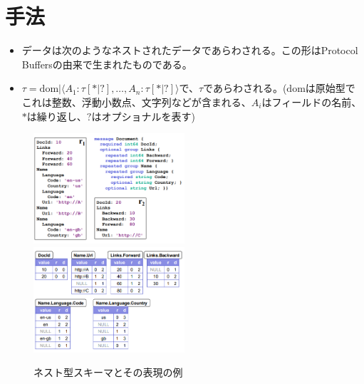 \documentclass[dvipdfmx,uplatex]{jsarticle}
\theoremstyle{remark}
\newenvironment{method}[1]{
    \begin{tcolorbox}[
        colframe=green!50!black,
        colback=green!50!black!10!white,
        colbacktitle=green!50!black!40!white,
        coltitle=black,
        fonttitle=\bfseries,
        title={#1}
    ]
}{
    \end{tcolorbox}
}
\begin{document}
\section{手法}
\begin{method}{データモデル}
\begin{itemize}
    \item データは次のようなネストされたデータであらわされる。この形はProtocol Buffersの由来で生まれたものである。
    \item $\tau = \mathrm{dom} | \langle A_1: \tau[*|?], \dots, A_n: \tau[*|?] \rangle$で、$\tau$であらわされる。($\mathrm{dom}$は原始型でこれは整数、浮動小数点、文字列などが含まれる、$A_i$はフィールドの名前、$*$は繰り返し、$?$はオプショナルを表す)
\end{itemize}
\end{method}

\begin{figure}
    \centering
    \includegraphics[width=0.5\textwidth]{img/dremel/schema.png}
    \includegraphics[width=0.5\textwidth]{img/dremel/repeat.png}
    \caption{ネスト型スキーマとその表現の例}
    \label{fig:dremel_schema}
\end{figure}
\end{document}

